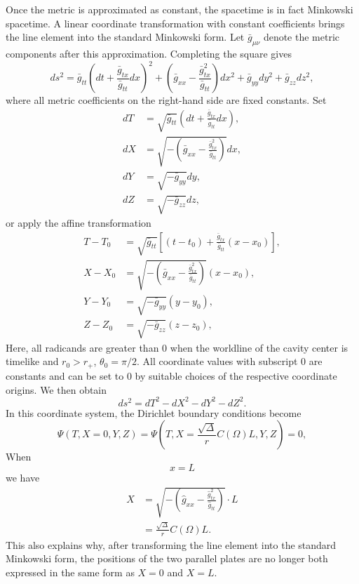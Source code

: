 \documentclass[english]{article}
\begin{document}
Once the metric is approximated as constant, the spacetime is in fact
Minkowski spacetime. A linear coordinate transformation with constant
coefficients brings the line element into the standard Minkowski form.
Let $\bar{g}_{\mu\nu}$ denote the metric components after this approximation.
Completing the square gives 
\[
ds^{2}=\bar{g}_{tt}\left(dt+\frac{\bar{g}_{tx}}{\bar{g}_{tt}}dx\right)^{2}+\left(\bar{g}_{xx}-\frac{\bar{g}^{2}_{tx}}{\bar{g}_{tt}}\right)dx^{2}+\bar{g}_{yy}dy^{2}+\bar{g}_{zz}dz^{2},
\]
 where all metric coefficients on the right-hand side are fixed constants.
Set 
\begin{align*}
dT & =\sqrt{\bar{g}_{tt}}\left(dt+\frac{\bar{g}_{tx}}{\bar{g}_{tt}}dx\right),\\
dX & =\sqrt{-\left(\bar{g}_{xx}-\frac{\bar{g}^{2}_{tx}}{\bar{g}_{tt}}\right)}dx,\\
dY & =\sqrt{-\bar{g}_{yy}}dy,\\
dZ & =\sqrt{-\bar{g}_{zz}}dz,
\end{align*}
 or apply the affine transformation 
\begin{align*}
T-T_{0} & =\sqrt{\bar{g}_{tt}}\left[\left(t-t_{0}\right)+\frac{\bar{g}_{tx}}{\bar{g}_{tt}}\left(x-x_{0}\right)\right],\\
X-X_{0} & =\sqrt{-\left(\bar{g}_{xx}-\frac{\bar{g}^{2}_{tx}}{\bar{g}_{tt}}\right)}\left(x-x_{0}\right),\\
Y-Y_{0} & =\sqrt{-\bar{g}_{yy}}\left(y-y_{0}\right),\\
Z-Z_{0} & =\sqrt{-\bar{g}_{zz}}\left(z-z_{0}\right),
\end{align*}
 Here, all radicands are greater than $0$ when the worldline of the
cavity center is timelike and $r_{0}>r_{+}$, $\theta_{0}=\pi/2$.
All coordinate values with subscript $0$ are constants and can be
set to $0$ by suitable choices of the respective coordinate origins.
We then obtain 
\[
ds^{2}=dT^{2}-dX^{2}-dY^{2}-dZ^{2}.
\]
 In this coordinate system, the Dirichlet boundary conditions become
\[
\Psi\left(T,X=0,Y,Z\right)=\Psi\left(T,X=\frac{\sqrt{\Delta}}{r}C\left(\Omega\right)L,Y,Z\right)=0,
\]
 When 
\[
x=L
\]
 we have 
\begin{align*}
X & =\sqrt{-\left(\hat{g}_{xx}-\frac{\hat{g}^{2}_{tx}}{\hat{g}_{tt}}\right)}\cdot L\\
 & =\frac{\sqrt{\Delta}}{r}C\left(\Omega\right)L.
\end{align*}
 This also explains why, after transforming the line element into
the standard Minkowski form, the positions of the two parallel plates
are no longer both expressed in the same form as $X=0$ and $X=L$.
\end{document}
